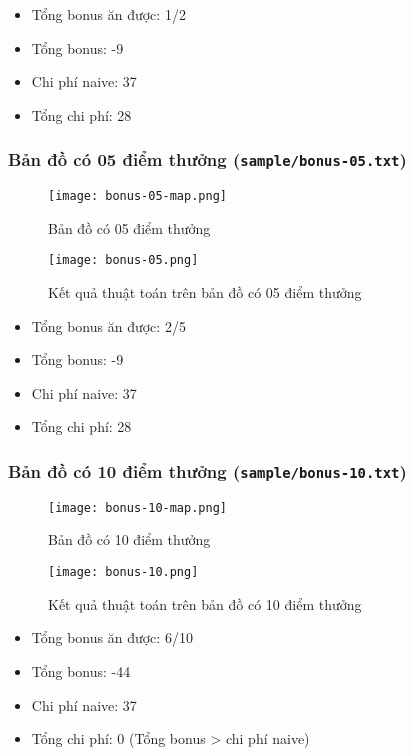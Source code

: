 \documentclass{article}
\begin{document}
\begin{itemize}
	\item Tổng bonus ăn được: 1/2
	\item Tổng bonus: -9
	\item Chi phí naive: 37
	\item Tổng chi phí: 28
\end{itemize}

\subsubsection{Bản đồ có 05 điểm thưởng (\texttt{sample/bonus-05.txt})}
\begin{figure}[H]
	\centering
	\texttt{[image: bonus-05-map.png]}
	\caption{Bản đồ có 05 điểm thưởng}
\end{figure}

\begin{figure}[H]
	\centering
	\texttt{[image: bonus-05.png]}
	\caption{Kết quả thuật toán trên bản đồ có 05 điểm thưởng}
\end{figure}

\begin{itemize}
	\item Tổng bonus ăn được: 2/5
	\item Tổng bonus: -9
	\item Chi phí naive: 37
	\item Tổng chi phí: 28
\end{itemize}

\subsubsection{Bản đồ có 10 điểm thưởng (\texttt{sample/bonus-10.txt})}
\begin{figure}[H]
	\centering
	\texttt{[image: bonus-10-map.png]}
	\caption{Bản đồ có 10 điểm thưởng}
\end{figure}

\begin{figure}[H]
	\centering
	\texttt{[image: bonus-10.png]}
	\caption{Kết quả thuật toán trên bản đồ có 10 điểm thưởng}
\end{figure}

\begin{itemize}
\item Tổng bonus ăn được: 6/10
\item Tổng bonus: -44
\item Chi phí naive: 37
\item Tổng chi phí: 0 (Tổng bonus > chi phí naive)
\end{itemize}
\end{document}
